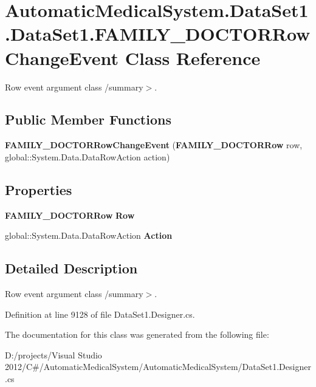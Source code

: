 \section{AutomaticMedicalSystem.DataSet1.DataSet1.FAMILY\_\-DOCTORRowChangeEvent Class Reference}
\label{class_automatic_medical_system_1_1_data_set1_1_1_f_a_m_i_l_y___d_o_c_t_o_r_row_change_event}
Row event argument class /summary$>$.  


\subsection*{Public Member Functions}
\begin{CompactItemize}
\item 
\textbf{FAMILY\_\-DOCTORRowChangeEvent} ({\bf FAMILY\_\-DOCTORRow} row, global::System.Data.DataRowAction action)\label{class_automatic_medical_system_1_1_data_set1_1_1_f_a_m_i_l_y___d_o_c_t_o_r_row_change_event_06c545a188d902f843a97a6146b24311}

\end{CompactItemize}
\subsection*{Properties}
\begin{CompactItemize}
\item 
{\bf FAMILY\_\-DOCTORRow} \textbf{Row}\hspace{0.3cm}{\tt  [get]}\label{class_automatic_medical_system_1_1_data_set1_1_1_f_a_m_i_l_y___d_o_c_t_o_r_row_change_event_8f6ecf5111a1840c414dd04bde6d23e2}

\item 
global::System.Data.DataRowAction \textbf{Action}\hspace{0.3cm}{\tt  [get]}\label{class_automatic_medical_system_1_1_data_set1_1_1_f_a_m_i_l_y___d_o_c_t_o_r_row_change_event_c7309071763061464d1cfd46f27d3bb6}

\end{CompactItemize}


\subsection{Detailed Description}
Row event argument class /summary$>$. 

Definition at line 9128 of file DataSet1.Designer.cs.

The documentation for this class was generated from the following file:\begin{CompactItemize}
\item 
D:/projects/Visual Studio 2012/C\#/AutomaticMedicalSystem/AutomaticMedicalSystem/DataSet1.Designer.cs\end{CompactItemize}
